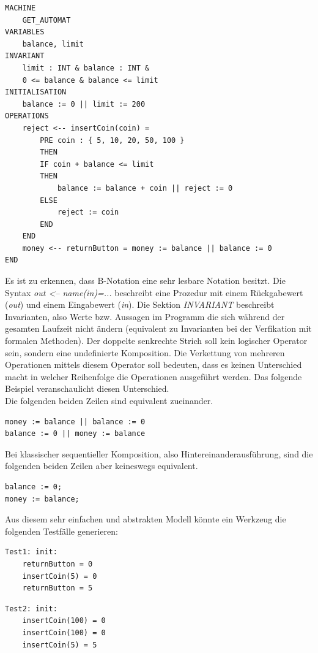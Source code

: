 \begin{lstlisting}[caption={Modell eines Getränkeautomaten in B-Notation},label=lst:b-notation]
MACHINE
	GET_AUTOMAT
VARIABLES
	balance, limit
INVARIANT
	limit : INT & balance : INT &
	0 <= balance & balance <= limit
INITIALISATION
	balance := 0 || limit := 200
OPERATIONS
	reject <-- insertCoin(coin) =
		PRE coin : { 5, 10, 20, 50, 100 }
		THEN
		IF coin + balance <= limit
		THEN
			balance := balance + coin || reject := 0
		ELSE
			reject := coin
		END
	END
	money <-- returnButton = money := balance || balance := 0
END
\end{lstlisting}

Es ist zu erkennen, dass B-Notation eine sehr lesbare Notation besitzt. Die Syntax \textit{out <-- name(in)=...} beschreibt eine Prozedur mit einem Rückgabewert (\textit{out}) und einem Eingabewert (\textit{in}). Die Sektion \textit{INVARIANT} beschreibt Invarianten, also Werte bzw. Aussagen im Programm die sich während der gesamten Laufzeit nicht ändern (equivalent zu Invarianten bei der Verfikation mit formalen Methoden). Der doppelte senkrechte Strich soll kein logischer Operator sein, sondern eine undefinierte Komposition. Die Verkettung von mehreren Operationen mittels diesem Operator soll bedeuten, dass es keinen Unterschied macht in welcher Reihenfolge die Operationen ausgeführt werden. Das folgende Beispiel veranschaulicht diesen Unterschied.\\

Die folgenden beiden Zeilen sind equivalent zueinander.
\begin{verbatim}
money := balance || balance := 0
balance := 0 || money := balance
\end{verbatim}

Bei klassischer sequentieller Komposition, also Hintereinanderausführung, sind die folgenden beiden Zeilen aber keineswegs equivalent.
\begin{verbatim}
balance := 0;
money := balance;
\end{verbatim}

Aus diesem sehr einfachen und abstrakten Modell könnte ein Werkzeug die folgenden Testfälle generieren:\\

\begin{verbatim}
Test1: init:
	returnButton = 0
	insertCoin(5) = 0
	returnButton = 5
\end{verbatim}

\begin{verbatim}
Test2: init:
	insertCoin(100) = 0
	insertCoin(100) = 0
	insertCoin(5) = 5
\end{verbatim}

